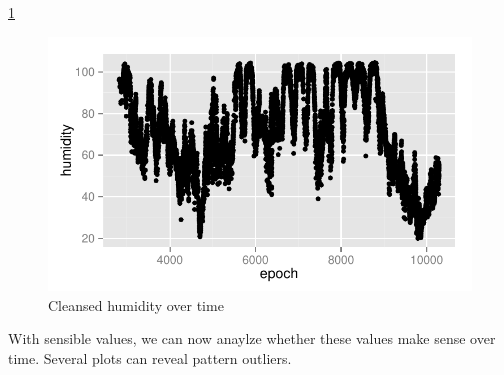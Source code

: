 \documentclass{article}\usepackage[]{graphicx}\usepackage[]{color}
\makeatletter
\def\maxwidth{ %
  \ifdim\Gin@nat@width>\linewidth
    \linewidth
  \else
    \Gin@nat@width
  \fi
}
\newenvironment{knitrout}{}{} %
\makeatother
\begin{document}
\ref{fig:plot_cleansed_net_epoch_humidity}
\begin{knitrout}
\color{fgcolor}\begin{figure}[h!]


{\centering \includegraphics[width=\maxwidth]{figure/plot_cleansed_net_epoch_humidity} 

}

\caption[Cleansed humidity over time]{Cleansed humidity over time\label{fig:plot_cleansed_net_epoch_humidity}}
\end{figure}


\end{knitrout}


With sensible values, we can now anaylze whether these values make sense over time.  Several plots can reveal pattern outliers.
\end{document}
